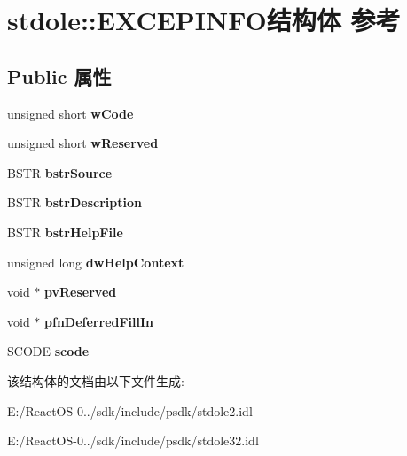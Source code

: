 \hypertarget{structstdole_1_1_e_x_c_e_p_i_n_f_o}{}\section{stdole\+:\+:E\+X\+C\+E\+P\+I\+N\+F\+O结构体 参考}
\label{structstdole_1_1_e_x_c_e_p_i_n_f_o}
\subsection*{Public 属性}
\begin{DoxyCompactItemize}
\item 
\mbox{\label{structstdole_1_1_e_x_c_e_p_i_n_f_o_ad7f094a14897a98e42f6d4d5db4cafd6}} 
unsigned short {\bfseries w\+Code}
\item 
\mbox{\label{structstdole_1_1_e_x_c_e_p_i_n_f_o_a99232b5f7d91a3efba233cad7dc862f6}} 
unsigned short {\bfseries w\+Reserved}
\item 
\mbox{\label{structstdole_1_1_e_x_c_e_p_i_n_f_o_a5b2b8b92e673a04dd666a617ca562a1f}} 
B\+S\+TR {\bfseries bstr\+Source}
\item 
\mbox{\label{structstdole_1_1_e_x_c_e_p_i_n_f_o_a23b4ffe02e7961eb0cdeb6aca3a61b38}} 
B\+S\+TR {\bfseries bstr\+Description}
\item 
\mbox{\label{structstdole_1_1_e_x_c_e_p_i_n_f_o_ab27ab771e1b15e2479b79954611259e1}} 
B\+S\+TR {\bfseries bstr\+Help\+File}
\item 
\mbox{\label{structstdole_1_1_e_x_c_e_p_i_n_f_o_ac7c99409c93cf3b38ada3ee3bd83d40f}} 
unsigned long {\bfseries dw\+Help\+Context}
\item 
\mbox{\label{structstdole_1_1_e_x_c_e_p_i_n_f_o_ae735c06eeb4d2242fb67bceb2acd2932}} 
\hyperlink{interfacevoid}{void} $\ast$ {\bfseries pv\+Reserved}
\item 
\mbox{\label{structstdole_1_1_e_x_c_e_p_i_n_f_o_a8438c7726be91e60d77fcf8ed7a19f99}} 
\hyperlink{interfacevoid}{void} $\ast$ {\bfseries pfn\+Deferred\+Fill\+In}
\item 
\mbox{\label{structstdole_1_1_e_x_c_e_p_i_n_f_o_a851a5eb50e905294c4a50eae3ea3f969}} 
S\+C\+O\+DE {\bfseries scode}
\end{DoxyCompactItemize}


该结构体的文档由以下文件生成\+:\begin{DoxyCompactItemize}
\item 
E\+:/\+React\+O\+S-\/0../sdk/include/psdk/stdole2.\+idl\item 
E\+:/\+React\+O\+S-\/0../sdk/include/psdk/stdole32.\+idl\end{DoxyCompactItemize}
